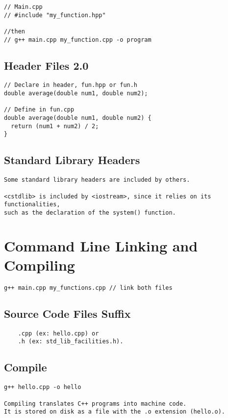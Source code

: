 \documentclass[openany]{report}
\begin{document}
\begin{verbatim}
// Main.cpp
// #include "my_function.hpp"

//then
// g++ main.cpp my_function.cpp -o program
\end{verbatim}

\subsection{Header Files 2.0}

\begin{verbatim}
// Declare in header, fun.hpp or fun.h
double average(double num1, double num2);

// Define in fun.cpp
double average(double num1, double num2) {
  return (num1 + num2) / 2;
}
\end{verbatim}

\subsection{Standard Library Headers}

\begin{verbatim}
Some standard library headers are included by others. 

<cstdlib> is included by <iostream>, since it relies on its functionalities,
such as the declaration of the system() function. 
\end{verbatim}

\section{Command Line Linking and Compiling}

\begin{verbatim}
g++ main.cpp my_functions.cpp // link both files
\end{verbatim}

\subsection{Source Code Files Suffix}

\begin{verbatim}
    .cpp (ex: hello.cpp) or
    .h (ex: std_lib_facilities.h).
\end{verbatim}

\subsection{Compile}
\begin{verbatim}
g++ hello.cpp -o hello

Compiling translates C++ programs into machine code.
It is stored on disk as a file with the .o extension (hello.o). 
\end{verbatim}
\end{document}
